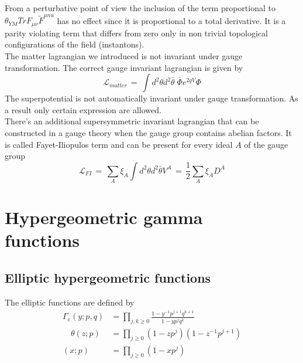 \begin{appendices}
From a perturbative point of view the inclusion of the term proportional to $\theta_{YM} {Tr} F_{ \mu \nu} \tilde{F}^{\mu nu }  $ has no effect since it is proportional to a total derivative. 
It is a parity violating term that differs from zero only in non trivial topological configurations of the field (instantons).
\\
The matter lagrangian we introduced is not invariant under gauge transformation.
The correct gauge invariant lagrangian is given by
\begin{equation}
 \mathcal{L}_{matter} \, = \, \int d^2 \theta d^2 \bar{\theta} \; \bar{\Phi} e^{ 2 g V} \Phi 
\end{equation}
The superpotential is not automatically invariant under gauge transformation. As a result only certain expression are allowed.
\\
There's an additional supersymmetric invariant lagrangian that can be constructed in a gauge theory when the gauge group contains abelian factors. 
It is called Fayet-Iliopulos term and can be present for every ideal $A$ of the gauge group
\begin{equation}
 \mathcal{L}_{FI} \, = \, \sum_{A} \xi_A \int d^2 \theta d^2 \bar{\theta} V^{A} \, = \, \frac{1}{2} \sum_{A} \xi_A D^A
 \end{equation}
































\chapter{Hypergeometric gamma \\ functions}
\label{appendix:gamma_functions}
\section{Elliptic hypergeometric functions}
The elliptic functions are defined by
\begin{equation} 
	\begin{aligned}
	   \Gamma_e (y;p,q) &= \prod_{j,k \geq 0} \frac{ 1 - y^{-1} p^{j+1} q^{k+1}}{ 1 - y p^j q^k}\\
	  \quad \theta(z;p) &= \prod_{j \geq 0 } (1- z p^j) ( 1- z^{-1}p^{j+1}) \\
	  (x;p) &= \prod_{j \geq 0} ( 1- xp^j)
  	\end{aligned}
\label{eqn:ellptic_hyper_definitions}
\end{equation}


\end{appendices}
